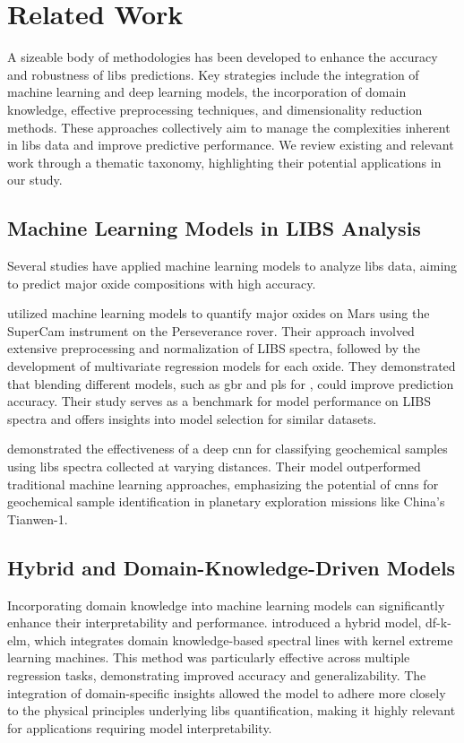 \section{Related Work}
A sizeable body of methodologies has been developed to enhance the accuracy and robustness of \gls{libs} predictions.
Key strategies include the integration of machine learning and deep learning models, the incorporation of domain knowledge, effective preprocessing techniques, and dimensionality reduction methods.
These approaches collectively aim to manage the complexities inherent in \gls{libs} data and improve predictive performance.
We review existing and relevant work through a thematic taxonomy, highlighting their potential applications in our study.

\subsection{Machine Learning Models in LIBS Analysis}
Several studies have applied machine learning models to analyze \gls{libs} data, aiming to predict major oxide compositions with high accuracy.

\citet{andersonPostlandingMajorElement2022} utilized machine learning models to quantify major oxides on Mars using the SuperCam instrument on the Perseverance rover.
Their approach involved extensive preprocessing and normalization of LIBS spectra, followed by the development of multivariate regression models for each oxide.
They demonstrated that blending different models, such as \gls{gbr} and \gls{pls} for , could improve prediction accuracy.
Their study serves as a benchmark for model performance on LIBS spectra and offers insights into model selection for similar datasets.

\citet{yangConvolutionalNeuralNetwork2022} demonstrated the effectiveness of a deep \gls{cnn} for classifying geochemical samples using \gls{libs} spectra collected at varying distances.
Their model outperformed traditional machine learning approaches, emphasizing the potential of \gls{cnn}s for geochemical sample identification in planetary exploration missions like China's Tianwen-1.

\subsection{Hybrid and Domain-Knowledge-Driven Models}
Incorporating domain knowledge into machine learning models can significantly enhance their interpretability and performance.
\citet{song_DF-K-ELM} introduced a hybrid model, \gls{df}-\gls{k-elm}, which integrates domain knowledge-based spectral lines with kernel extreme learning machines.
This method was particularly effective across multiple regression tasks, demonstrating improved accuracy and generalizability.
The integration of domain-specific insights allowed the model to adhere more closely to the physical principles underlying \gls{libs} quantification, making it highly relevant for applications requiring model interpretability.

